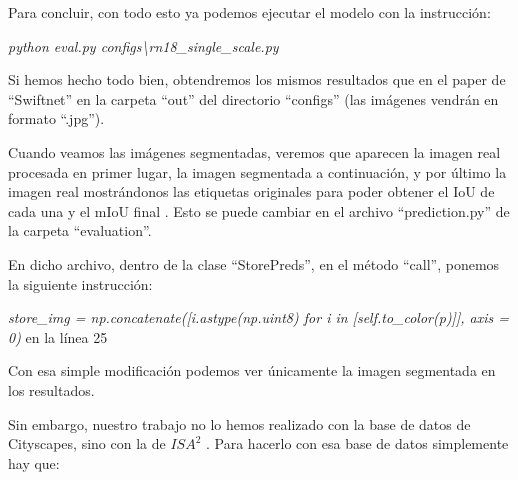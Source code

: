 Para concluir, con todo esto ya podemos ejecutar el modelo con la instrucción:

\begin{center}
\textit{python eval.py configs\textbackslash{rn18\_single\_scale.py}}
\end{center}

Si hemos hecho todo bien, obtendremos los mismos resultados que en el paper de ``Swiftnet'' \cite{swiftnet} en la carpeta ``out'' del directorio ``configs'' (las imágenes vendrán en formato ``.jpg'').

Cuando veamos las imágenes segmentadas, veremos que aparecen la imagen real procesada en primer lugar, la imagen segmentada a continuación, y por último la imagen real mostrándonos las etiquetas originales para poder obtener el \ac{IoU} de cada una y el \ac{mIoU} final \cite{miou-iou}. Esto se puede cambiar en el archivo ``prediction.py'' de la carpeta ``evaluation''.

En dicho archivo, dentro de la clase ``StorePreds'', en el método ``call'', ponemos la siguiente instrucción:

\begin{center}
\textit{store\_img = np.concatenate([i.astype(np.uint8) for i in [self.to\_color(p)]], axis = 0)} en la línea 25
\end{center}

Con esa simple modificación podemos ver únicamente la imagen segmentada en los resultados.

Sin embargo, nuestro trabajo no lo hemos realizado con la base de datos de Cityscapes, sino con la de $ISA^{2}$ \cite{isa2}. Para hacerlo con esa base de datos simplemente hay que:

